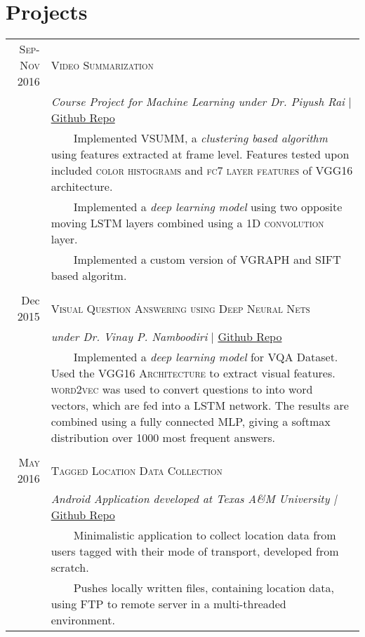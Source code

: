 \documentclass[a4paper,10pt]{article}
\newcommand{\tabitem}{~~\llap{\textbullet}~~}
\begin{document}
\section{Projects}
\centering
\begin{longtable}{r|p{11cm}}
\textsc{Sep-Nov 2016} & \large \textsc{Video Summarization}\\
& \textit{Course Project for Machine Learning under Dr. Piyush Rai } | \href{http://github.com/architsharma97/VideoSummarization/}{Github Repo}\\
& \tabitem Implemented VSUMM, a \textit{clustering based algorithm} using features extracted at frame level. Features tested upon included \textsc{color histograms} and \textsc{fc7 layer features} of \textsc{VGG16} architecture.\\
& \tabitem Implemented a \textit{deep learning model} using two opposite moving \textsc{LSTM} layers combined using a \textsc{1D convolution} layer.\\
& \tabitem Implemented a custom version of VGRAPH and SIFT based algoritm.\\
\multicolumn{2}{c}{}\\
Dec 2015 & \large \textsc{Visual Question Answering using Deep Neural Nets}\\
& \textit{under Dr. Vinay P. Namboodiri } | \href{https://github.com/architsharma97/VisualQA}{Github Repo}\\
& \tabitem Implemented a \textit{deep learning model} for VQA Dataset. Used the \textsc{VGG16 Architecture} to extract visual features. \textsc{word2vec} was used to convert questions to into word vectors, which are fed into a LSTM network. The results are combined using a fully connected MLP, giving a softmax distribution over 1000 most frequent answers.\\
\multicolumn{2}{c}{}\\
\textsc{May 2016} & \large \textsc{Tagged Location Data Collection}\\
& \textit{Android Application developed at Texas A\&M University | } \href{https://github.com/architsharma97/LocationTagger}{Github Repo}\\
& \tabitem Minimalistic application to collect location data from users tagged with their mode of transport, developed from scratch.\\
& \tabitem Pushes locally written files, containing location data, using FTP to remote server in a multi-threaded environment.
\end{longtable}
\end{document}
